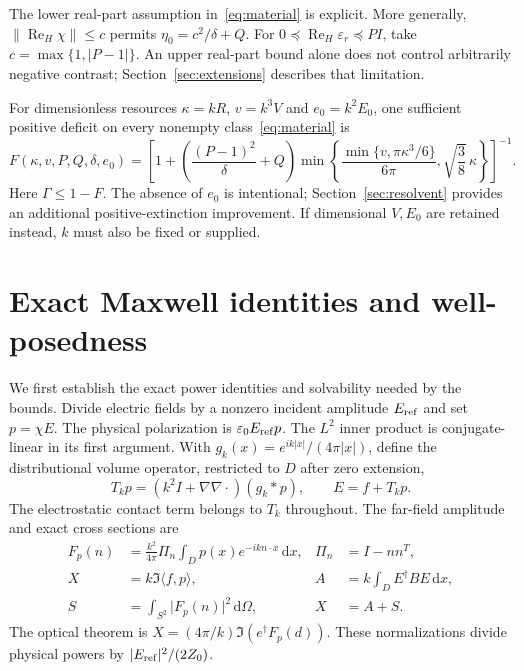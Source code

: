 \documentclass[11pt]{article}
\newcommand{\ReH}{\operatorname{Re}_{\!H}}
\newcommand{\dd}{\,\mathrm{d}}
\newcommand{\ip}[2]{\langle #1,#2\rangle}
\newcommand{\norm}[1]{\lVert #1\rVert}
\newcommand{\abs}[1]{\lvert #1\rvert}
\begin{document}
The lower real-part assumption in~\eqref{eq:material} is explicit. More generally, $\norm{\ReH\chi}\leq c$ permits $\eta_0=c^2/\delta+Q$. For $0\preceq\ReH\varepsilon_r\preceq PI$, take $c=\max\{1,\abs{P-1}\}$. An upper real-part bound alone does not control arbitrarily negative contrast; Section~\ref{sec:extensions} describes that limitation.

For dimensionless resources $\kappa=kR$, $v=k^3V$ and $e_0=k^2E_0$, one sufficient positive deficit on every nonempty class~\eqref{eq:material} is
\begin{equation}\label{eq:dimensionless}
 F(\kappa,v,P,Q,\delta,e_0)=
 \left[1+\left(\frac{(P-1)^2}{\delta}+Q\right)
 \min\left\{\frac{\min\{v,\pi\kappa^3/6\}}{6\pi},
              \sqrt{\frac38}\,\kappa\right\}\right]^{-1}.
\end{equation}
Here $\Gamma\leq1-F$. The absence of $e_0$ is intentional; Section~\ref{sec:resolvent} provides an additional positive-extinction improvement. If dimensional $V,E_0$ are retained instead, $k$ must also be fixed or supplied.

\section{Exact Maxwell identities and well-posedness}\label{sec:maxwell}
We first establish the exact power identities and solvability needed by the bounds. Divide electric fields by a nonzero incident amplitude $E_{\rm ref}$ and set $p=\chi E$. The physical polarization is $\varepsilon_0E_{\rm ref}p$. The $L^2$ inner product is conjugate-linear in its first argument. With $g_k(x)=e^{ik\abs x}/(4\pi\abs x)$, define the distributional volume operator, restricted to $D$ after zero extension,
\begin{equation}\label{eq:volume}
 T_kp=(k^2I+\nabla\nabla\cdot)(g_k*p),\qquad E=f+T_kp.
\end{equation}
The electrostatic contact term belongs to $T_k$ throughout. The far-field amplitude and exact cross sections are
\begin{align}
 F_p(n)&=\frac{k^2}{4\pi}\Pi_n\int_Dp(x)e^{-ikn\cdot x}\dd x,
 &\Pi_n&=I-nn^T,\label{eq:far}\\
 X&=k\Im\ip f p,
 &A&=k\int_DE^\dagger BE\dd x,\label{eq:powers}\\
 S&=\int_{S^2}\abs{F_p(n)}^2\dd\Omega,
 &X&=A+S.\label{eq:energy}
\end{align}
The optical theorem is $X=(4\pi/k)\Im(e^\dagger F_p(d))$. These normalizations divide physical powers by $\abs{E_{\rm ref}}^2/(2Z_0)$.
\end{document}
